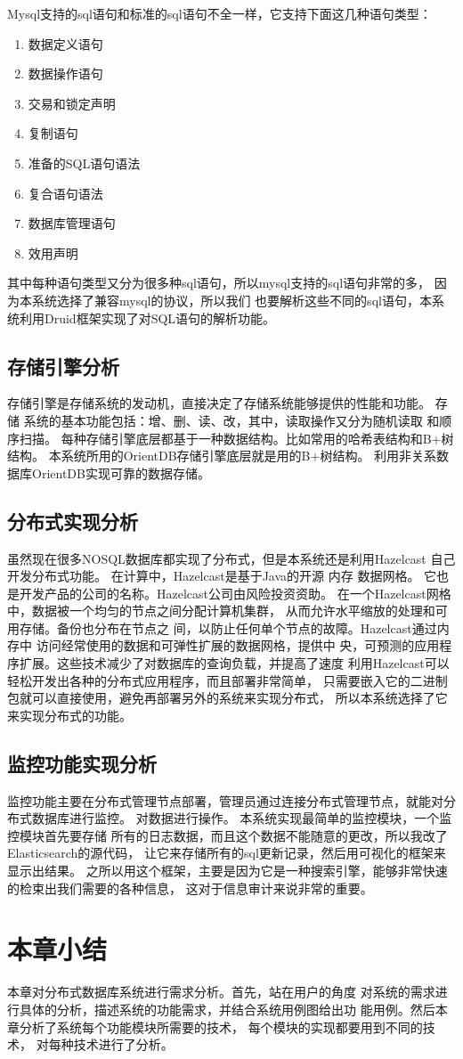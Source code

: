 Mysql支持的sql语句和标准的sql语句不全一样，它支持下面这几种语句类型：
\begin{enumerate}
\item 数据定义语句     
\item 数据操作语句     
\item 交易和锁定声明     
\item 复制语句     
\item 准备的SQL语句语法     
\item 复合语句语法     
\item 数据库管理语句     
\item 效用声明  
\end{enumerate}   
其中每种语句类型又分为很多种sql语句，所以mysql支持的sql语句非常的多，
因为本系统选择了兼容mysql的协议，所以我们
也要解析这些不同的sql语句，本系统利用Druid框架实现了对SQL语句的解析功能。
\subsection{存储引擎分析}
存储引擎是存储系统的发动机，直接决定了存储系统能够提供的性能和功能。
存储
系统的基本功能包括：增、删、读、改，其中，读取操作又分为随机读取
和顺序扫描。
每种存储引擎底层都基于一种数据结构。比如常用的哈希表结构和B+树结构。
本系统所用的OrientDB存储引擎底层就是用的B+树结构。
利用非关系数据库OrientDB实现可靠的数据存储。
\subsection{分布式实现分析}
虽然现在很多NOSQL数据库都实现了分布式，但是本系统还是利用Hazelcast
自己开发分布式功能。
在计算中，Hazelcast是基于Java的开源 内存 数据网格。
它也是开发产品的公司的名称。Hazelcast公司由风险投资资助。
在一个Hazelcast网格中，数据被一个均匀的节点之间分配计算机集群，
从而允许水平缩放的处理和可用存储。备份也分布在节点之
间，以防止任何单个节点的故障。Hazelcast通过内存中
访问经常使用的数据和可弹性扩展的数据网格，提供中
央，可预测的应用程序扩展。这些技术减少了对数据库的查询负载，并提高了速度
利用Hazelcast可以轻松开发出各种的分布式应用程序，而且部署非常简单，
只需要嵌入它的二进制包就可以直接使用，避免再部署另外的系统来实现分布式，
所以本系统选择了它来实现分布式的功能。
\subsection{监控功能实现分析}
监控功能主要在分布式管理节点部署，管理员通过连接分布式管理节点，就能对分布式数据库进行监控。
对数据进行操作。
本系统实现最简单的监控模块，一个监控模块首先要存储
所有的日志数据，而且这个数据不能随意的更改，所以我改了Elasticsearch的源代码，
让它来存储所有的sql更新记录，然后用可视化的框架来显示出结果。
之所以用这个框架，主要是因为它是一种搜索引擎，能够非常快速的检束出我们需要的各种信息，
这对于信息审计来说非常的重要。
\section{本章小结}
本章对分布式数据库系统进行需求分析。首先，站在用户的角度
对系统的需求进行具体的分析，描述系统的功能需求，并结合系统用例图给出功
能用例。然后本章分析了系统每个功能模块所需要的技术，
每个模块的实现都要用到不同的技术，
对每种技术进行了分析。